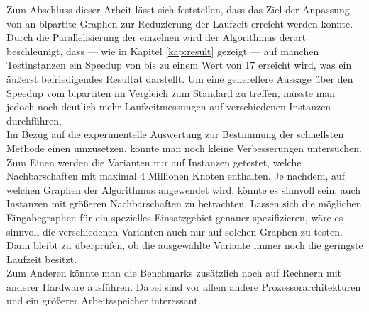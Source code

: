 Zum Abschluss dieser Arbeit lässt sich feststellen, dass das Ziel 
der Anpassung von \gc{} an bipartite Graphen zur Reduzierung der Laufzeit erreicht werden konnte.
Durch die Parallelisierung der einzelnen  wird der Algorithmus derart beschleunigt, dass --- wie
in Kapitel \ref{kap:result} gezeigt --- auf manchen Testinstanzen ein
Speedup von bis zu einem Wert von 17 erreicht wird, was ein äußerst befriedigendes Resultat darstellt. 
Um eine generellere Aussage über den Speedup vom bipartiten \gc{} im Vergleich zum Standard  \gc{}
zu treffen, müsste man jedoch noch deutlich mehr Laufzeitmessungen auf verschiedenen Instanzen
durchführen.
\\

Im Bezug auf die experimentelle Auswertung zur Bestimmung der schnellsten Methode 
einen \ct{} umzusetzen, könnte man noch kleine Verbesserungen untersuchen.
\\
Zum Einen werden die Varianten nur auf Instanzen getestet, welche Nachbarschaften mit 
maximal 4 Millionen Knoten enthalten. Je nachdem, auf welchen Graphen der Algorithmus angewendet wird, 
könnte es sinnvoll sein, auch Instanzen
mit größeren Nachbarschaften zu betrachten. Lassen sich die möglichen Eingabegraphen
für ein spezielles Einsatzgebiet genauer spezifizieren, wäre es sinnvoll die verschiedenen
Varianten auch nur auf solchen Graphen zu testen. Dann bleibt zu überprüfen, ob die ausgewählte
Variante immer noch die geringste Laufzeit besitzt.
\\
Zum Anderen könnte man die Benchmarks zusätzlich noch auf Rechnern mit anderer Hardware ausführen.
Dabei sind vor allem andere Prozessorarchitekturen und ein größerer Arbeitsspeicher interessant.

